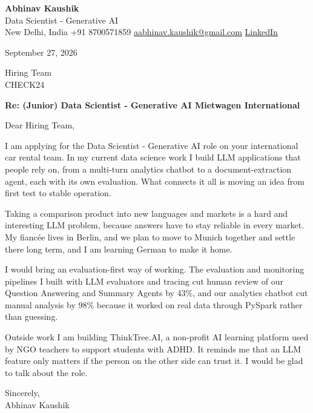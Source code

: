 \documentclass[11pt,a4paper]{article}
\begin{document}
{\Large\bfseries Abhinav Kaushik}\\
Data Scientist - Generative AI\\
New Delhi, India \textbar{} +91 8700571859 \textbar{} \href{mailto:aabhinav.kaushik@gmail.com}{aabhinav.kaushik@gmail.com} \textbar{} \href{https://www.linkedin.com/in/abhinav-kaushik10/}{LinkedIn}  

September 27, 2026

Hiring Team\\
CHECK24

\textbf{Re: (Junior) Data Scientist - Generative AI Mietwagen International}

Dear Hiring Team,

I am applying for the Data Scientist - Generative AI role on your international car rental team. In my current data science work I build LLM applications that people rely on, from a multi-turn analytics chatbot to a document-extraction agent, each with its own evaluation. What connects it all is moving an idea from first test to stable operation.

Taking a comparison product into new languages and markets is a hard and interesting LLM problem, because answers have to stay reliable in every market. My fiancée lives in Berlin, and we plan to move to Munich together and settle there long term, and I am learning German to make it home.

I would bring an evaluation-first way of working. The evaluation and monitoring pipelines I built with LLM evaluators and tracing cut human review of our Question Answering and Summary Agents by 43\%, and our analytics chatbot cut manual analysis by 98\% because it worked on real data through PySpark rather than guessing.

Outside work I am building ThinkTree.AI, a non-profit AI learning platform used by NGO teachers to support students with ADHD. It reminds me that an LLM feature only matters if the person on the other side can trust it. I would be glad to talk about the role.

Sincerely,\\[4pt]
Abhinav Kaushik
\end{document}
